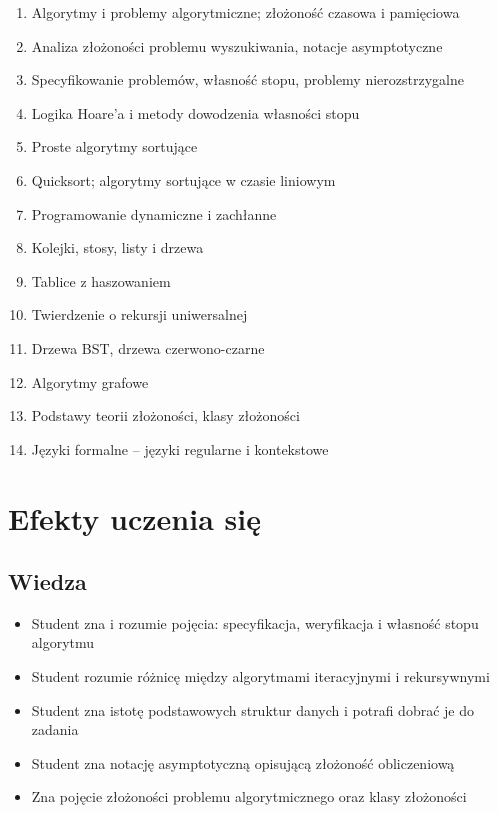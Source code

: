 \documentclass[12pt, a4paper]{article}
\begin{document}
\begin{enumerate}
  \item Algorytmy i problemy algorytmiczne; złożoność czasowa i pamięciowa
  \item Analiza złożoności problemu wyszukiwania, notacje asymptotyczne
  \item Specyfikowanie problemów, własność stopu, problemy nierozstrzygalne
  \item Logika Hoare'a i metody dowodzenia własności stopu
  \item Proste algorytmy sortujące
  \item Quicksort; algorytmy sortujące w czasie liniowym
  \item Programowanie dynamiczne i zachłanne
  \item Kolejki, stosy, listy i drzewa
  \item Tablice z haszowaniem
  \item Twierdzenie o rekursji uniwersalnej
  \item Drzewa BST, drzewa czerwono-czarne
  \item Algorytmy grafowe
  \item Podstawy teorii złożoności, klasy złożoności
  \item Języki formalne -- języki regularne i kontekstowe
\end{enumerate}

\section{Efekty uczenia się}

\subsection*{Wiedza}
\begin{itemize}
  \item Student zna i rozumie pojęcia: specyfikacja, weryfikacja i własność stopu algorytmu
  \item Student rozumie różnicę między algorytmami iteracyjnymi i rekursywnymi
  \item Student zna istotę podstawowych struktur danych i potrafi dobrać je do zadania
  \item Student zna notację asymptotyczną opisującą złożoność obliczeniową
  \item Zna pojęcie złożoności problemu algorytmicznego oraz klasy złożoności
\end{itemize}
\end{document}
